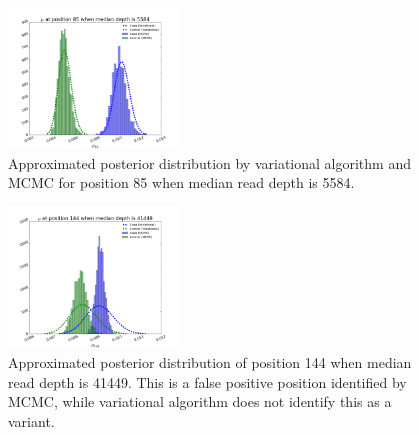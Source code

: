 \documentclass{article}
\begin{document}
\begin{figure}[h]
\centering
\vspace{-10pt}
\includegraphics[width=0.4\textwidth]{figs/position_85_5584_mcmc_vs_var_mu.png}
\caption{Approximated posterior distribution by variational algorithm and MCMC for position 85 when median read depth is 5584.}
\vspace{-10pt}
\label{tbl:posterior_mcmc_var_1}
\end{figure}


\begin{figure}[!htbp]
\centering
\includegraphics[width=0.4\textwidth]{figs/position_144_41449_mcmc_vs_var_mu.png}
\caption{Approximated posterior distribution of position 144 when median read depth is 41449. This is a false positive position identified by MCMC, while variational algorithm does not identify this as a variant.}
\vspace{-10pt}
\label{tbl:posterior_mcmc_var_3}
\end{figure}
\end{document}
